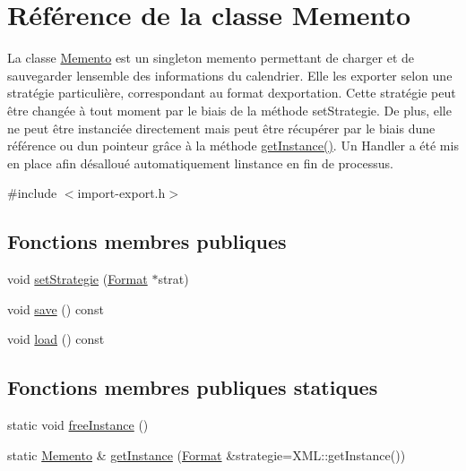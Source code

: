 \hypertarget{class_memento}{}\section{Référence de la classe Memento}
\label{class_memento}


La classe \hyperlink{class_memento}{Memento} est un singleton memento permettant de charger et de sauvegarder l\textquotesingle{}ensemble des informations du calendrier. Elle les exporter selon une stratégie particulière, correspondant au format d\textquotesingle{}exportation. Cette stratégie peut être changée à tout moment par le biais de la méthode set\+Strategie. De plus, elle ne peut être instanciée directement mais peut être récupérer par le biais d\textquotesingle{}une référence ou d\textquotesingle{}un pointeur grâce à la méthode \hyperlink{class_memento_a0d8167075a7e5f8890d8cbe1bd3d1273}{get\+Instance()}. Un Handler a été mis en place afin désalloué automatiquement l\textquotesingle{}instance en fin de processus.  




{\ttfamily \#include $<$import-\/export.\+h$>$}

\subsection*{Fonctions membres publiques}
\begin{DoxyCompactItemize}
\item 
void \hyperlink{class_memento_a2ab0539c90bdafdce79776841f3f835b}{set\+Strategie} (\hyperlink{class_format}{Format} $\ast$strat)
\item 
void \hyperlink{class_memento_a36b2b96d212c9fe1338e80ae41912fa3}{save} () const 
\item 
void \hyperlink{class_memento_a05119b7214605862ef8e48d0d6bb2713}{load} () const 
\end{DoxyCompactItemize}
\subsection*{Fonctions membres publiques statiques}
\begin{DoxyCompactItemize}
\item 
static void \hyperlink{class_memento_a8e97e83e767bd9cb13c6ddcf16125553}{free\+Instance} ()
\item 
static \hyperlink{class_memento}{Memento} \& \hyperlink{class_memento_a0d8167075a7e5f8890d8cbe1bd3d1273}{get\+Instance} (\hyperlink{class_format}{Format} \&strategie=X\+M\+L\+::get\+Instance())
\end{DoxyCompactItemize}


